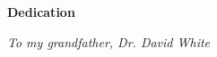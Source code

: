 \phantom{x}\\
\phantom{x}\\
\vspace{1.1em}

\begin{center}
\textbf{\LARGE Dedication}
\end{center}

\begin{center}
\emph{To my grandfather, Dr. David White}
\end{center}

